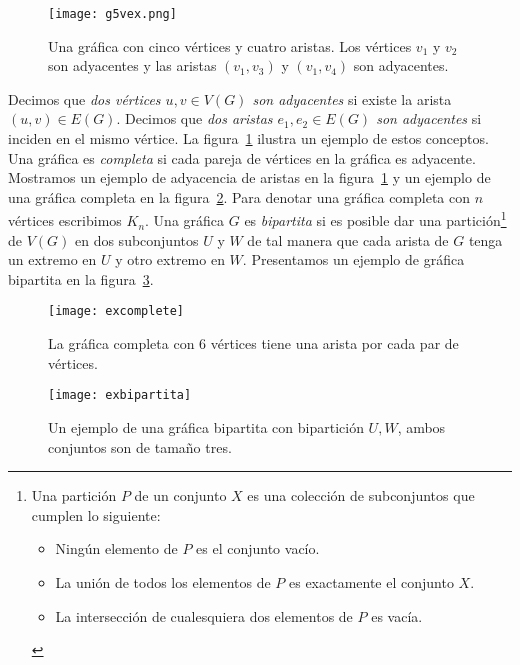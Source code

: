 \begin{figure}[t]
  \centering
  \texttt{[image: g5vex.png]}
  \caption{Una gráfica con cinco vértices y cuatro aristas. Los vértices $v_1$ y $v_2$
  son adyacentes y las aristas $(v_1,v_3)$ y $(v_1,v_4)$ son adyacentes.}
  \label{fig:g5vex}
\end{figure}
Decimos que \emph{dos vértices $u,v\in V(G)$ son adyacentes} si existe la arista
$(u,v)\in E(G)$. Decimos que \emph{dos aristas $e_1,e_2 \in E(G)$ son adyacentes}
si inciden en el mismo vértice. La figura~\ref{fig:g5vex} ilustra
un ejemplo de estos conceptos.
Una gráfica es \emph{completa} si cada pareja de vértices
en la gráfica es adyacente. Mostramos un ejemplo de adyacencia de
aristas en la figura~\ref{fig:g5vex} y un ejemplo de una gráfica completa en la figura~\ref{fig:excomplete}.
Para denotar una gráfica completa con $n$
vértices escribimos $K_n$. Una gráfica $G$ es \emph{bipartita} si es posible
dar una partición\footnote{Una partición $P$ de un conjunto $X$ es
una colección de subconjuntos que cumplen lo siguiente:
\begin{itemize}
\item Ningún elemento de $P$ es el conjunto vacío.
\item La unión de todos los elementos de $P$ es exactamente el conjunto $X$.
\item La intersección de cualesquiera dos elementos de $P$ es vacía.
\end{itemize} }
de $V(G)$ en dos subconjuntos $U$ y $W$ de tal manera que cada
arista de $G$ tenga un extremo en $U$ y otro extremo en $W$. Presentamos
un ejemplo de gráfica bipartita en la figura~\ref{fig:exbipar}.
\begin{figure}[htb]
  \centering
  \texttt{[image: excomplete]}
  \caption{La gráfica completa con 6 vértices tiene una arista por cada par de vértices.}
  \label{fig:excomplete}
\end{figure}
\begin{figure}[h]
  \centering
  \texttt{[image: exbipartita]}
  \caption{Un ejemplo de una gráfica bipartita con bipartición $U, W$, ambos conjuntos son de tamaño tres.}
  \label{fig:exbipar}
\end{figure}

